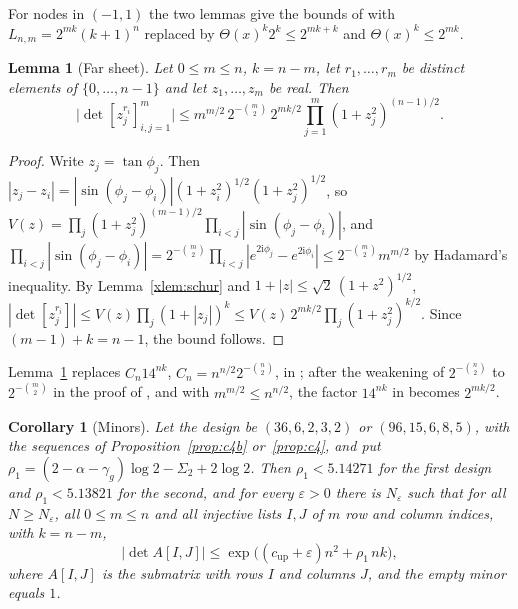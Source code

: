 \documentclass[11pt]{article}
\newtheorem{lemma}[theorem]{Lemma}
\newtheorem{corollary}[theorem]{Corollary}
\theoremstyle{definition}
\begin{document}
For nodes in $(-1,1)$ the two lemmas give the bounds of \cite[Lemma~4.1, Corollary~4.2]{Jha} with $L_{n,m}=2^{mk}(k+1)^n$ replaced by $\Theta(x)^k2^k\le2^{mk+k}$ and $\Theta(x)^k\le2^{mk}$.

\begin{lemma}[Far sheet]\label{xlem:far}
Let $0\le m\le n$, $k=n-m$, let $r_1,\dots,r_m$ be distinct elements of $\{0,\dots,n-1\}$ and let $z_1,\dots,z_m$ be real. Then
\[
\big|\det[z_j^{r_i}]_{i,j=1}^m\big|\le m^{m/2}\,2^{-\binom m2}\,2^{mk/2}\prod_{j=1}^m(1+z_j^2)^{(n-1)/2}.
\]
\end{lemma}

\begin{proof}
Write $z_j=\tan\phi_j$. Then $|z_j-z_i|=|\sin(\phi_j-\phi_i)|(1+z_i^2)^{1/2}(1+z_j^2)^{1/2}$, so $V(z)=\prod_j(1+z_j^2)^{(m-1)/2}\prod_{i<j}|\sin(\phi_j-\phi_i)|$, and $\prod_{i<j}|\sin(\phi_j-\phi_i)|=2^{-\binom m2}\prod_{i<j}|e^{2\mathrm i\phi_j}-e^{2\mathrm i\phi_i}|\le2^{-\binom m2}m^{m/2}$ by Hadamard's inequality. By Lemma~\ref{xlem:schur} and $1+|z|\le\sqrt2\,(1+z^2)^{1/2}$, $|\det[z_j^{r_i}]|\le V(z)\prod_j(1+|z_j|)^k\le V(z)\,2^{mk/2}\prod_j(1+z_j^2)^{k/2}$. Since $(m-1)+k=n-1$, the bound follows.
\end{proof}

Lemma~\ref{xlem:far} replaces $C_n14^{nk}$, $C_n=n^{n/2}2^{-\binom n2}$, in \cite[Lemma~4.5]{Jha}; after the weakening of $2^{-\binom n2}$ to $2^{-\binom m2}$ in the proof of \cite[Lemma~6.2]{Jha}, and with $m^{m/2}\le n^{n/2}$, the factor $14^{nk}$ in \cite[(6.6)]{Jha} becomes $2^{mk/2}$.

\begin{corollary}[Minors]\label{xcor:massminors}
Let the design be $(36,6,2,3,2)$ or $(96,15,6,8,5)$, with the sequences of Proposition~\ref{prop:c4b} or~\ref{prop:c4}, and put $\rho_1=(2-\alpha-\gamma_g)\log2-\Sigma_2+2\log2$. Then $\rho_1<5.14271$ for the first design and $\rho_1<5.13821$ for the second, and for every $\varepsilon>0$ there is $N_\varepsilon$ such that for all $N\ge N_\varepsilon$, all $0\le m\le n$ and all injective lists $I,J$ of $m$ row and column indices, with $k=n-m$,
\[
\big|\det A[I,J]\big|\le\exp\!\big((c_{\mathrm{up}}+\varepsilon)n^2+\rho_1\,nk\big),
\]
where $A[I,J]$ is the submatrix with rows $I$ and columns $J$, and the empty minor equals $1$.
\end{corollary}
\end{document}
